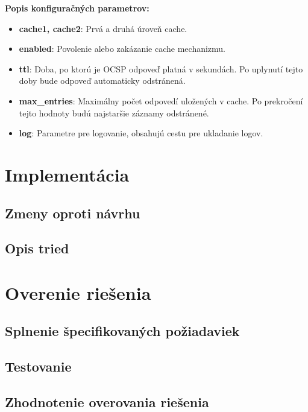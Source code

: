 \documentclass[12pt, twoside]{book}
\begin{document}
\textbf{Popis konfiguračných parametrov:}
\begin{itemize}
\item \textbf{cache1, cache2}: Prvá a druhá úroveň cache.

\item \textbf{enabled}: Povolenie alebo zakázanie cache mechanizmu.

\item \textbf{ttl}: Doba, po ktorú je OCSP odpoveď platná v sekundách. Po uplynutí tejto doby bude odpoveď automaticky odstránená.

\item \textbf{max\_entries}: Maximálny počet odpovedí uložených v cache. Po prekročení tejto hodnoty budú najstaršie záznamy odstránené.

\item \textbf{log}: Parametre pre logovanie, obsahujú cestu pre ukladanie logov.
\end{itemize}




\section{Implementácia}


\subsection{Zmeny oproti návrhu}


\subsection{Opis tried}


\section{Overenie riešenia}


\subsection{Splnenie špecifikovaných požiadaviek}



\subsection{Testovanie}


\subsection{Zhodnotenie overovania riešenia}
\end{document}
